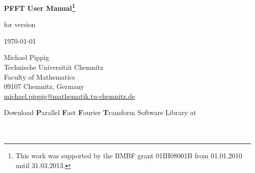 \documentclass[a4paper,11pt,final,openright,headsepline]{scrreprt}
\numberwithin{figure}{chapter}
\numberwithin{table}{chapter}
\numberwithin{equation}{chapter}
\begin{document}
  \setcounter{equation}{0}
  \begin{titlepage}
    \begin{center}
      \vspace*{3cm}
      {\Huge {\textbf{\textsf{PFFT User Manual\footnote{This work was supported by the BMBF grant 01IH08001B from 01.01.2010 until 31.03.2013.}\\}}}}

      \vspace*{0.5cm}
      for version \pfftversion

      \vspace*{1cm}
      \today
      
      \vspace*{3cm}
        Michael Pippig\\
        Technische Universit\"at Chemnitz\\
        Faculty of Mathematics\\
        09107 Chemnitz, Germany\\
        \href{mailto:michael.pippig@mathematik.tu-chemnitz.de}{michael.pippig@mathematik.tu-chemnitz.de}

    \vspace*{3cm}
      Download \textbf{\Large P}arallel \textbf{\Large F}ast \textbf{\Large F}ourier \textbf{\Large T}ransform Software Library at \\
      {\large \websoft}\\
      {\large \webpfft}\\
    \end{center}
  \end{titlepage}

  \listoftodos
  \tableofcontents
 



  
  
\end{document}
